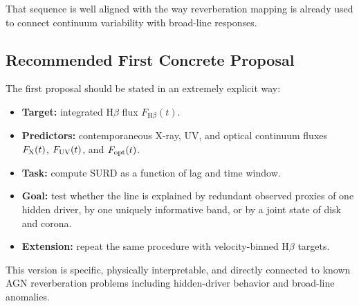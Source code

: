 \documentclass{article}
\begin{document}
That sequence is well aligned with the way reverberation mapping is already used to connect continuum variability with broad-line responses.

\subsection{Recommended First Concrete Proposal}

The first proposal should be stated in an extremely explicit way:

\begin{itemize}
    \item \textbf{Target:} integrated H$\beta$ flux \(F_{\mathrm{H}\beta}(t)\).
    \item \textbf{Predictors:} contemporaneous X-ray, UV, and optical continuum fluxes \(F_{\rm X}(t)\), \(F_{\rm UV}(t)\), and \(F_{\rm opt}(t)\).
    \item \textbf{Task:} compute SURD as a function of lag and time window.
    \item \textbf{Goal:} test whether the line is explained by redundant observed proxies of one hidden driver, by one uniquely informative band, or by a joint state of disk and corona.
    \item \textbf{Extension:} repeat the same procedure with velocity-binned H$\beta$ targets.
\end{itemize}

This version is specific, physically interpretable, and directly connected to known AGN reverberation problems including hidden-driver behavior and broad-line anomalies.


\printbibliography
\end{document}
